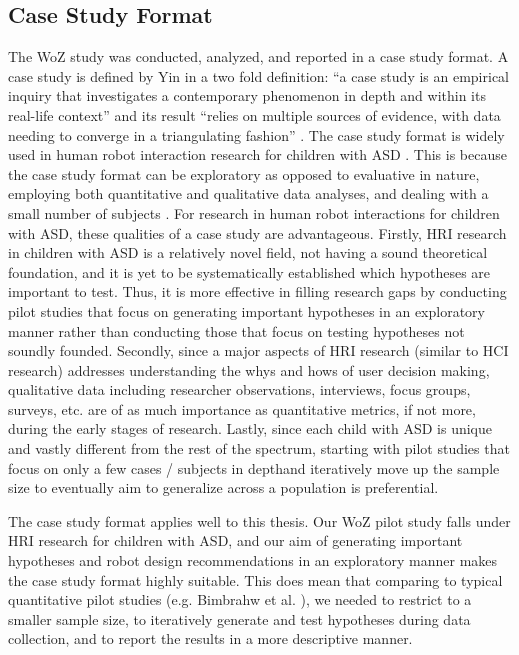 \documentclass{ut-thesis}
\providecommand{\DIFaddtex}[1]{{\protect\color{blue}\uwave{#1}}} %
\providecommand{\DIFaddbegin}{} %
\providecommand{\DIFaddend}{} %
\providecommand{\DIFadd}[1]{\texorpdfstring{\DIFaddtex{#1}}{#1}} %
\begin{document}
\subsection{Case Study Format}
The WoZ study was conducted, analyzed, and reported in a case study format.  A case study is defined by Yin in a two fold definition: ``a case study is an empirical inquiry that investigates a contemporary phenomenon in depth and within its real-life context'' and its result ``relies on multiple sources of evidence, with data needing to converge in a triangulating fashion'' \cite{yin2013case}.  The case study format is widely used in human robot interaction research for children with ASD \cite{kozima2005interactive, robins2004robot, robins2009isolation}.  This is because the case study format can be exploratory as opposed to evaluative in nature, employing both quantitative and qualitative data analyses, and dealing with a small number of subjects \cite{yin2013case}.  For research in human robot interactions for children with ASD, these qualities of a case study are advantageous.  Firstly, HRI research in children with ASD is a relatively novel field, not having a sound theoretical foundation, and it is yet to be systematically established which hypotheses are important to test.  Thus, it is more effective in filling research gaps by conducting pilot studies that focus on generating important hypotheses in an exploratory manner rather than conducting those that focus on testing hypotheses not soundly founded.  Secondly, since a major aspects of HRI research (similar to HCI research) addresses understanding the whys and hows of user decision making, qualitative data including researcher observations, interviews, focus groups, surveys, etc. are of as much importance as quantitative metrics, if not more, during the early stages of research.  Lastly, since each child with ASD is unique and vastly different from the rest of the spectrum, starting with pilot studies that focus on only a few cases / subjects in depth\DIFaddbegin \DIFadd{, demonstrate the research approach's feasibility, }\DIFaddend and iteratively move up the sample size to eventually aim to generalize across a population is preferential.

The case study format applies well to this thesis.  Our WoZ pilot study falls under HRI research for children with ASD, and our aim of generating important hypotheses and robot design recommendations in an exploratory manner makes the case study format highly suitable.  This does mean that comparing to typical quantitative pilot studies (e.g. Bimbrahw et al. \cite{bimbrahw2012investigating}), we needed to restrict to a smaller sample size, to iteratively generate and test hypotheses during data collection, and to report the results in a more descriptive manner.
\end{document}
